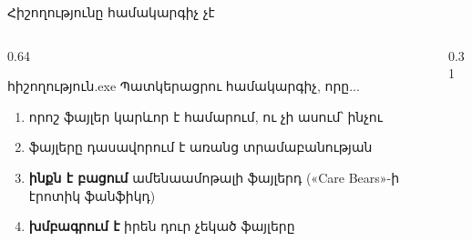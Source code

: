 \begin{frame}{Հիշողությունը համակարգիչ չէ}
  \begin{columns}[c]
    \begin{column}{0.64\textwidth}
      \begin{popup}{հիշողություն.exe}
        Պատկերացրու համակարգիչ, որը...
        \begin{enumerate}
          \item<2-> որոշ ֆայլեր կարևոր է համարում, ու չի ասում՝ ինչու
          \item<3-> ֆայլերը դասավորում է առանց տրամաբանության
          \item<4-> \textbf{ինքն է բացում} ամենաամոթալի ֆայլերդ («Care Bears»-ի էրոտիկ ֆանֆիկդ)
          \item<5-> \textbf{խմբագրում է} իրեն դուր չեկած ֆայլերը
        \end{enumerate}
      \end{popup}
    \end{column}
    \begin{column}{0.31\textwidth}
    \end{column}
  \end{columns}
\end{frame}


